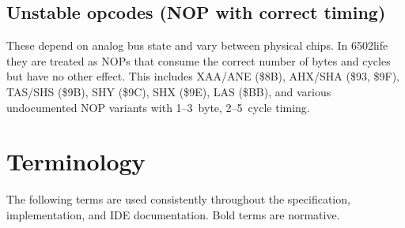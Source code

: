 \documentclass{article}
\begin{document}
\subsection{Unstable opcodes (NOP with correct timing)}
These depend on analog bus state and vary between physical chips. In 6502life
they are treated as NOPs that consume the correct number of bytes and cycles
but have no other effect. This includes XAA/ANE (\$8B), AHX/SHA (\$93, \$9F),
TAS/SHS (\$9B), SHY (\$9C), SHX (\$9E), LAS (\$BB), and various undocumented
NOP variants with 1--3~byte, 2--5~cycle timing.

\section{Terminology}

The following terms are used consistently throughout the specification,
implementation, and IDE documentation. Bold terms are normative.
\end{document}
